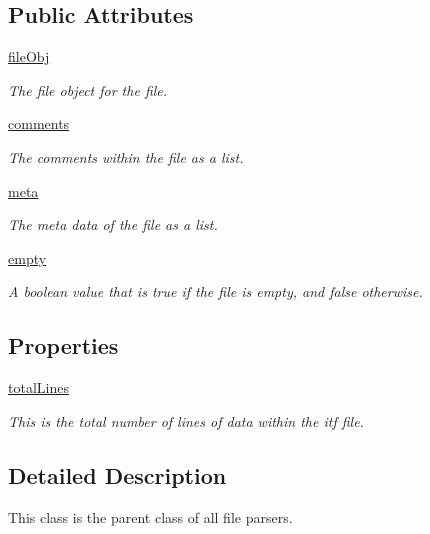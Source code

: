 \subsection*{Public Attributes}
\begin{DoxyCompactItemize}
\item 
\hyperlink{classfile_parser_1_1file_parser_a7de27c6e6e7bc515c7909be87ea82dca}{file\-Obj}
\begin{DoxyCompactList}\small\item\em The file object for the file. \end{DoxyCompactList}\item 
\hyperlink{classfile_parser_1_1file_parser_a9531ba3360a53c234d49f24cc3c0d5cd}{comments}
\begin{DoxyCompactList}\small\item\em The comments within the file as a list. \end{DoxyCompactList}\item 
\hyperlink{classfile_parser_1_1file_parser_aa84b3558bdd36dbba71265753c4fb04f}{meta}
\begin{DoxyCompactList}\small\item\em The meta data of the file as a list. \end{DoxyCompactList}\item 
\hyperlink{classfile_parser_1_1file_parser_a8a31b5717e4f21af3f8b5f8d2f590310}{empty}
\begin{DoxyCompactList}\small\item\em A boolean value that is true if the file is empty, and false otherwise. \end{DoxyCompactList}\end{DoxyCompactItemize}
\subsection*{Properties}
\begin{DoxyCompactItemize}
\item 
\hyperlink{classfile_parser_1_1file_parser_ad7d86e199f948e8ce19303dc875bb32f}{total\-Lines}
\begin{DoxyCompactList}\small\item\em This is the total number of lines of data within the itf file. \end{DoxyCompactList}\end{DoxyCompactItemize}


\subsection{Detailed Description}
This class is the parent class of all file parsers. 



